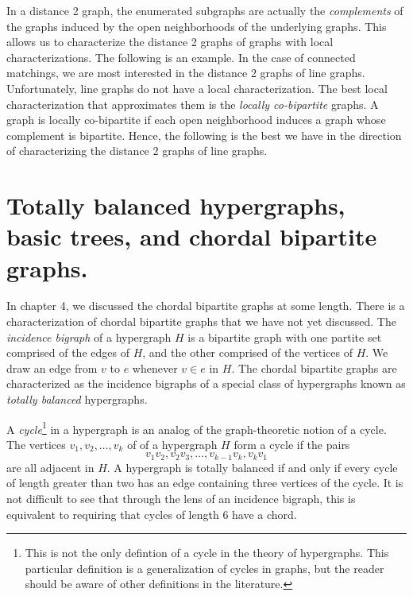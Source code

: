 In a distance 2 graph, the enumerated subgraphs are actually the {\it complements} of the graphs induced by the open neighborhoods of the underlying graphs.  This allows us to characterize the distance 2 graphs of graphs with local characterizations.  The following is an example.
In the case of connected matchings, we are most interested in the distance 2 graphs of line graphs.  Unfortunately, line graphs do not have a local characterization.  The best local characterization that approximates them is the {\it locally co-bipartite} graphs.  A graph is locally co-bipartite if each open neighborhood induces a graph whose complement is bipartite.  Hence, the following is the best we have in the direction of characterizing the distance 2 graphs of line graphs.
	
\section{Totally balanced hypergraphs, basic trees, and chordal bipartite graphs.}

In chapter 4, we discussed the chordal bipartite graphs at some length.  There is a characterization of chordal bipartite graphs that we have not yet discussed.  The {\it incidence bigraph} of a hypergraph $H$ is a bipartite graph with one partite set comprised of the edges of $H$, and the other comprised of the vertices of $H$.  We draw an edge from $v$ to $e$ whenever $v \in e$ in $H$.  The chordal bipartite graphs are characterized as the incidence bigraphs of a special class of hypergraphs known as {\it totally balanced} hypergraphs.

A {\it cycle}\footnote{This is not the only defintion of a cycle in the theory of hypergraphs.  This particular definition is a generalization of cycles in graphs, but the reader should be aware of other definitions in the literature. } in a hypergraph is an analog of the graph-theoretic notion of a cycle.  The vertices $v_1, v_2, \ldots , v_k$ of of a hypergraph $H$ form a cycle if the pairs \[v_1v_2, v_2v_3, \ldots, v_{k-1}v_k, v_kv_1\] are all adjacent in $H$.  A hypergraph is totally balanced if and only if every cycle of length greater than two has an edge containing three vertices of the cycle.  It is not difficult to see that through the lens of an incidence bigraph, this is equivalent to requiring that cycles of length 6 have a chord.

